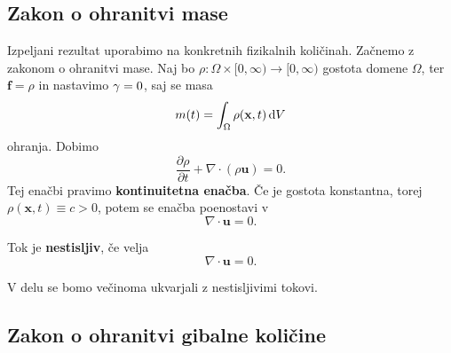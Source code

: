 \documentclass[mat2, tisk]{fmfdelo}
\newcommand{\bd}{\textbf}
\begin{document}
\subsection{Zakon o ohranitvi mase}
Izpeljani rezultat uporabimo na konkretnih fizikalnih količinah. 
Začnemo z zakonom o ohranitvi mase. Naj bo $\rho: \Omega \times [0, \infty) \rightarrow [0, \infty)$
gostota domene $\Omega$, ter $\bd{f} = \rho$ in nastavimo $\bd{\text{$\gamma$}} = 0$, saj se 
masa 
$$
m(t)= \int_\Omega \rho(\bd{x}, t) \dif V
$$
ohranja. Dobimo 
\begin{equation*}
\frac{\partial \rho}{\partial t} + \nabla \cdot (\rho \bd{u}) = 0.
\end{equation*}
Tej enačbi pravimo \bd{kontinuitetna enačba}. Če je gostota konstantna, torej \\$\rho(\bd{x}, t) \equiv c > 0$, potem se enačba poenostavi v  
\begin{equation*}
\nabla \cdot \bd{u} = 0.
\end{equation*}

\begin{definicija}
  Tok je \textbf{nestisljiv}, če velja 
  \begin{equation}
  \label{ohranitev mase}
    \nabla \cdot \bd{u} = 0.    
  \end{equation}
\end{definicija}

V delu se bomo večinoma ukvarjali z nestisljivimi tokovi.
\subsection{Zakon o ohranitvi gibalne količine}
\end{document}
